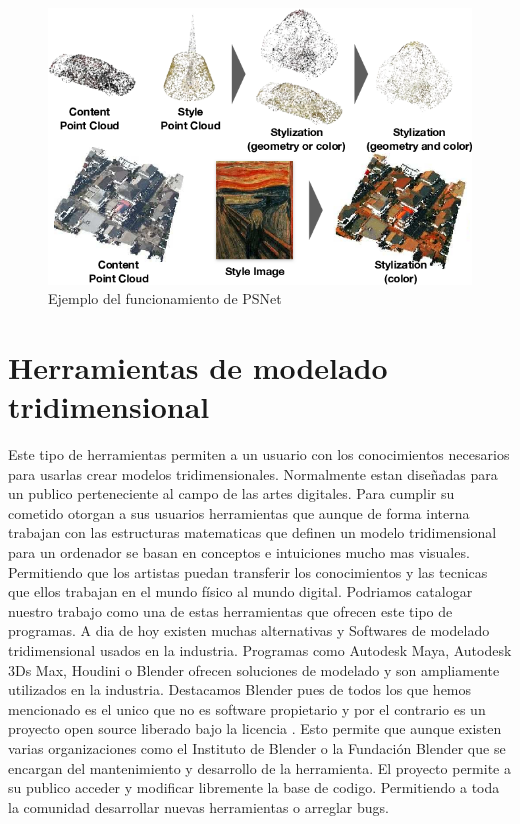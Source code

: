 \begin{figure}
    \centering
    \includegraphics[width=\textwidth]{imagenes/FiguraPaper.png}
    \caption{Ejemplo del funcionamiento de PSNet \cite{Cao_2020_WACV}}
\end{figure}

\section{Herramientas de modelado tridimensional}

Este tipo de herramientas permiten a un usuario con los conocimientos necesarios para usarlas crear modelos tridimensionales. Normalmente estan diseñadas para un publico perteneciente al campo de las artes digitales. Para cumplir su cometido otorgan a sus usuarios herramientas que aunque de forma interna trabajan con las estructuras matematicas que definen un modelo tridimensional
para un ordenador se basan en conceptos e intuiciones mucho mas visuales. Permitiendo que los artistas puedan transferir los conocimientos y las tecnicas que ellos trabajan en el mundo físico al mundo digital. Podriamos catalogar nuestro trabajo como una de estas herramientas que ofrecen este tipo de programas. A dia de hoy existen muchas alternativas y Softwares de modelado tridimensional
usados en la industria. Programas como Autodesk Maya, Autodesk 3Ds Max, Houdini o Blender ofrecen soluciones de modelado y son ampliamente utilizados en la industria. Destacamos Blender pues de todos los que hemos mencionado es el unico que no es software propietario y por el contrario es un proyecto open source liberado bajo la licencia \cite{gplv3}. Esto permite que aunque existen varias organizaciones
como el Instituto de Blender o la Fundación Blender que se encargan del mantenimiento y desarrollo de la herramienta. El proyecto permite a su publico acceder y modificar libremente la base de codigo. Permitiendo a toda la comunidad desarrollar nuevas herramientas o arreglar bugs. \cite{blenderAboutBlenderorg}

